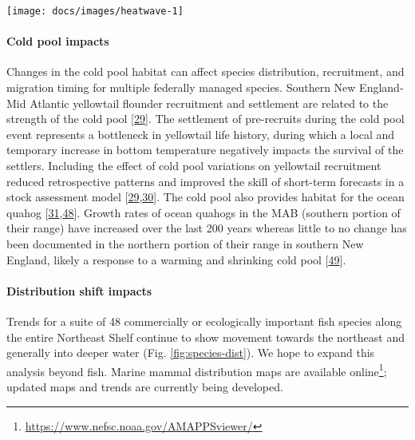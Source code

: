 \documentclass[
  10pt,
]{article}
\let\origfigure\figure
\let\endorigfigure\endfigure
\renewenvironment{figure}[1][2] {
    \expandafter\origfigure\expandafter[H]
} {
    \endorigfigure
}
\begin{document}
\begin{figure}

{\centering \texttt{[image: docs/images/heatwave-1]} 

}

\caption{Marine heatwave cumulative intesity (left) and maximum intensity (right) in the Mid-Atlantic Bight.}\label{fig:heatwave}
\end{figure}

\hypertarget{cold-pool-impacts}{%
\paragraph{Cold pool impacts}\label{cold-pool-impacts}}

Changes in the cold pool habitat can affect species distribution,
recruitment, and migration timing for multiple federally managed
species. Southern New England-Mid Atlantic yellowtail flounder
recruitment and settlement are related to the strength of the cold pool
{[}\protect\hyperlink{ref-miller_state-space_2016}{29}{]}. The
settlement of pre-recruits during the cold pool event represents a
bottleneck in yellowtail life history, during which a local and
temporary increase in bottom temperature negatively impacts the survival
of the settlers. Including the effect of cold pool variations on
yellowtail recruitment reduced retrospective patterns and improved the
skill of short-term forecasts in a stock assessment model
{[}\protect\hyperlink{ref-miller_state-space_2016}{29},\protect\hyperlink{ref-du_pontavice_incorporating_nodate}{30}{]}.
The cold pool also provides habitat for the ocean quahog
{[}\protect\hyperlink{ref-friedland_middle_2022}{31},\protect\hyperlink{ref-powell_ocean_2020}{48}{]}.
Growth rates of ocean quahogs in the MAB (southern portion of their
range) have increased over the last 200 years whereas little to no
change has been documented in the northern portion of their range in
southern New England, likely a response to a warming and shrinking cold
pool {[}\protect\hyperlink{ref-pace_two-hundred_2018}{49}{]}.

\hypertarget{distribution-shift-impacts}{%
\paragraph{Distribution shift
impacts}\label{distribution-shift-impacts}}

Trends for a suite of 48 commercially or ecologically important fish
species along the entire Northeast Shelf continue to show movement
towards the northeast and generally into deeper water (Fig.
\ref{fig:species-dist}). We hope to expand this analysis beyond fish.
Marine mammal distribution maps are available online\footnote{\url{https://www.nefsc.noaa.gov/AMAPPSviewer/}};
updated maps and trends are currently being developed.
\end{document}
